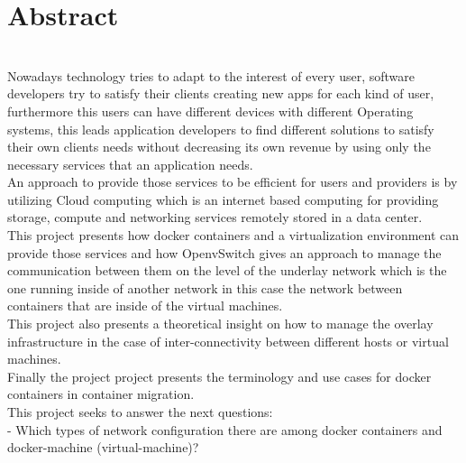 


\begingroup


\chapter*{Abstract}


\\

Nowadays technology tries to adapt to the interest of every user, software developers try to satisfy their clients creating new apps for each kind of user, furthermore this users can have different devices with different Operating systems, this leads application developers to find different solutions to satisfy their own clients needs without decreasing its own revenue by using only the necessary services that an application needs.
\\

An approach to provide those services to be efficient for users and providers is by utilizing Cloud computing which is an internet based computing for providing storage, compute and networking services remotely stored in a data center.
\\

This project presents how docker containers and a virtualization environment can provide those services and how OpenvSwitch gives an approach to manage the communication between them on the level of the underlay network which is the one running inside of another network in this case the network between containers that are inside of the virtual machines.
\\

This project also presents a theoretical insight on how to manage the overlay infrastructure in the case of inter-connectivity between different hosts or virtual machines.
\\

Finally the project project presents the terminology and use cases for docker containers in container migration.
\\

This project seeks to answer the next questions:\\

- Which types of network configuration there are among docker containers and docker-machine (virtual-machine)?

